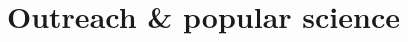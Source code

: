 \documentclass[11pt,a4paper]{article}
\begin{document}

\newpage

\section*{Outreach \& popular science}
\vspace{3pt}

\end{document}
